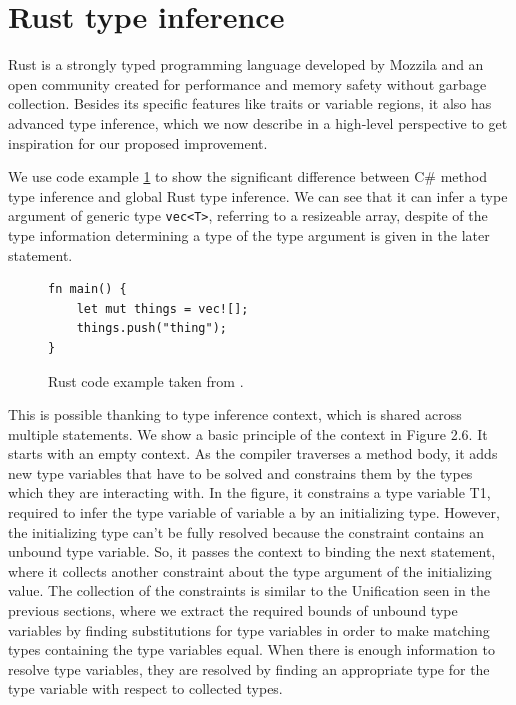 \section{Rust type inference}

Rust is a strongly typed programming language developed by Mozzila and an open community created for performance and memory safety without garbage collection. 
Besides its specific features like traits or variable regions, it also has advanced type inference, which we now describe in a high-level perspective to get inspiration for our proposed improvement.
\par
{}
We use code example \ref{img58:rustCodeExample} to show the significant difference between C\# method type inference and global Rust type inference.
We can see that it can infer a type argument of generic type \texttt{vec<T>}, referring to a resizeable array, despite of the type information determining a type of the type argument is given in the later statement.
\begin{figure}[h]
\begin{lstlisting}
fn main() {
    let mut things = vec![];
    things.push("thing");
}
\end{lstlisting}
\caption{Rust code example taken from \cite{online:rustTypeInference}.}
\label{img58:rustCodeExample}
\end{figure}
\par
This is possible thanking to type inference context, which is shared across multiple statements. 
We show a basic principle of the context in Figure 2.6. 
It starts with an empty context. 
As the compiler traverses a method body, it adds new type variables that have to be solved and constrains them by the types which they are interacting with. 
In the figure, it constrains a type variable T1, required to infer the type variable of variable a by an initializing type. 
However, the initializing type can't be fully resolved because the constraint contains an unbound type variable. 
So, it passes the context to binding the next statement, where it collects another constraint about the type argument of the initializing value. 
The collection of the constraints is similar to the Unification seen in the previous sections, where we extract the required bounds of unbound type variables by finding substitutions for type variables in order to make matching types containing the type variables equal.
When there is enough information to resolve type variables, they are resolved by finding an appropriate type for the type variable with respect to collected types.

